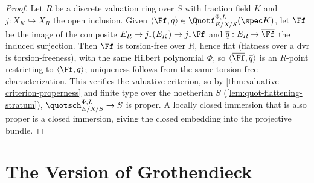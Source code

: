 \begin{proof}
  Let $R$ be a discrete valuation ring over $S$ with fraction field $K$ and
  $j : X_K \hookrightarrow X_R$ the open inclusion. Given
  $\langle \Ff, q\rangle \in \Quotf_{E/X/S}^{\Phi,L}(\spec K)$, let
  $\overline{\Ff}$ be the image of the composite
  $E_R \to j_*(E_K) \to j_*\Ff$ and $\overline{q} : E_R \to \overline{\Ff}$ the
  induced surjection. Then $\overline{\Ff}$ is torsion-free over $R$, hence flat
  (flatness over a dvr is torsion-freeness), with the same Hilbert polynomial
  $\Phi$, so $\langle \overline{\Ff}, \overline{q}\rangle$ is an $R$-point
  restricting to $\langle \Ff, q\rangle$; uniqueness follows from the same
  torsion-free characterization. This verifies the valuative criterion, so by
  \cref{thm:valuative-criterion-properness} and finite type over the noetherian
  $S$ (\cref{lem:quot-flattening-stratum}), $\quotsch_{E/X/S}^{\Phi,L} \to S$ is
  proper. A locally closed immersion that is also proper is a closed immersion,
  giving the closed embedding into the projective bundle.
\end{proof}

\bigskip
\section*{The Version of Grothendieck}
\medskip

